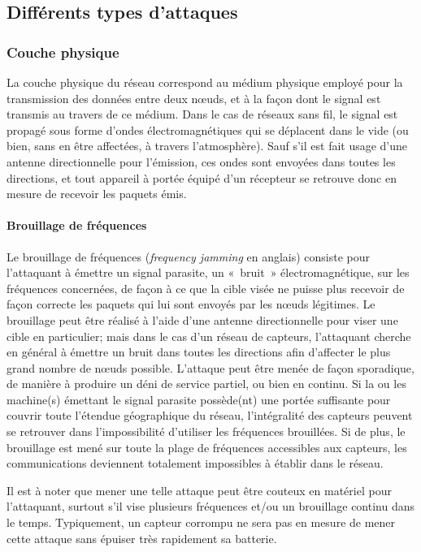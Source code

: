 \subsection{Différents types d'attaques}

    \subsubsection{Couche physique}
La couche physique du réseau correspond au médium physique employé pour la transmission des données entre deux nœuds, et à la façon dont le signal est transmis au travers de ce médium.
Dans le cas de réseaux sans fil, le signal est propagé sous forme d'ondes électromagnétiques qui se déplacent dans le vide (ou bien, sans en être affectées, à travers l'atmosphère).
Sauf s'il est fait usage d'une antenne directionnelle pour l'émission, ces ondes sont envoyées dans toutes les directions, et tout appareil à portée équipé d'un récepteur se retrouve donc en mesure de recevoir les paquets émis.

        \paragraph{Brouillage de fréquences}
Le brouillage de fréquences (\textit{frequency jamming} en anglais) consiste pour l'attaquant à émettre un signal parasite, un « bruit » électromagnétique, sur les fréquences concernées, de façon à ce que la cible visée ne puisse plus recevoir de façon correcte les paquets qui lui sont envoyés par les nœuds légitimes.
Le brouillage peut être réalisé à l'aide d'une antenne directionnelle pour viser une cible en particulier; mais dans le cas d'un réseau de capteurs, l'attaquant cherche en général à émettre un bruit dans toutes les directions afin d'affecter le plus grand nombre de nœuds possible.
L'attaque peut être menée de façon sporadique, de manière à produire un déni de service partiel, ou bien en continu.
Si la ou les machine(s) émettant le signal parasite possède(nt) une portée suffisante pour couvrir toute l'étendue géographique du réseau, l'intégralité des capteurs peuvent se retrouver dans l'impossibilité d'utiliser les fréquences brouillées.
Si de plus, le brouillage est mené sur toute la plage de fréquences accessibles aux capteurs, les communications deviennent totalement impossibles à établir dans le réseau.

Il est à noter que mener une telle attaque peut être couteux en matériel pour l'attaquant, surtout s'il vise plusieurs fréquences et/ou un brouillage continu dans le temps.
Typiquement, un capteur corrompu ne sera pas en mesure de mener cette attaque sans épuiser très rapidement sa batterie.

